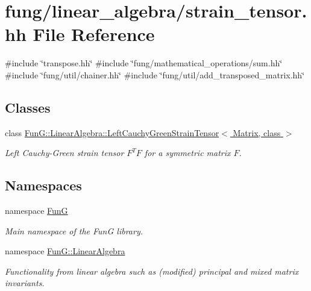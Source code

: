 \hypertarget{strain__tensor_8hh}{\section{fung/linear\-\_\-algebra/strain\-\_\-tensor.hh \-File \-Reference}
\label{strain__tensor_8hh}
}
{\ttfamily \#include \char`\"{}transpose.\-hh\char`\"{}}\*
{\ttfamily \#include \char`\"{}fung/mathematical\-\_\-operations/sum.\-hh\char`\"{}}\*
{\ttfamily \#include \char`\"{}fung/util/chainer.\-hh\char`\"{}}\*
{\ttfamily \#include \char`\"{}fung/util/add\-\_\-transposed\-\_\-matrix.\-hh\char`\"{}}\*
\subsection*{\-Classes}
\begin{DoxyCompactItemize}
\item 
class \hyperlink{classFunG_1_1LinearAlgebra_1_1LeftCauchyGreenStrainTensor}{\-Fun\-G\-::\-Linear\-Algebra\-::\-Left\-Cauchy\-Green\-Strain\-Tensor$<$ Matrix, class $>$}
\begin{DoxyCompactList}\small\item\em \-Left \-Cauchy-\/\-Green strain tensor $ F^T F $ for a symmetric matrix $ F $. \end{DoxyCompactList}\end{DoxyCompactItemize}
\subsection*{\-Namespaces}
\begin{DoxyCompactItemize}
\item 
namespace \hyperlink{namespaceFunG}{\-Fun\-G}
\begin{DoxyCompactList}\small\item\em \-Main namespace of the \-Fun\-G library. \end{DoxyCompactList}\item 
namespace \hyperlink{namespaceFunG_1_1LinearAlgebra}{\-Fun\-G\-::\-Linear\-Algebra}
\begin{DoxyCompactList}\small\item\em \-Functionality from linear algebra such as (modified) principal and mixed matrix invariants. \end{DoxyCompactList}\end{DoxyCompactItemize}
